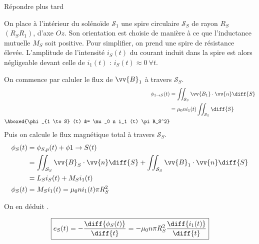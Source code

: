  Répondre plus tard

On place à l'intérieur du solénoïde $\mathcal{S}_1$ une spire circulaire $\mathcal{S}_S$ de rayon $R_S$ $\left( R_S  R_1 \right)$, d'axe $Oz$. Son orientation est choisie de manière à ce que l'inductance mutuelle $M_S$ soit positive. Pour simplifier, on prend une spire de résistance élevée. L'amplitude de l'intensité $i_S (t)$ du courant induit dans la spire est alors négligeable devant celle de $i_1 (t)$ : $i_S (t) \approx 0 ~ \forall t$.


On commence par caluler le flux de $\vv{B}_1$ à travers $\mathcal{S}_S$.
\begin{equation}
  \begin{split}
    \phi_{1 \to S} (t)
    &= \iint_{\mathcal{S}_S} \vv{B_1} \cdot \vv{n} \diff{S}\\
    &= \mu_0 n i_1 (t) \iint_{\mathcal{S}_S} \diff{S}\\
    \Aboxed{\phi_{1 \to S} (t)
    &= \mu_0 n i_1 (t) \pi R_S^2}
  \end{split}
\end{equation}
Puis on calcule le flux magnétique total à travers $\mathcal{S}_S$.
\begin{equation}
  \begin{split}
    \phi_S (t)
    &= \phi_{S,p} (t) + \phi{1 \to S} (t)\\
    &= \iint_{\mathcal{S}_S} \vv{B}_S \cdot \vv{n} \diff{S} + \iint_{\mathcal{S}_S} \vv{B}_1 \cdot \vv{n} \diff{S}\\
    &= L_S i_S (t) + M_S i_1 (t)\\
    \phi_S (t) &= M_S i_1(t) = \mu_0 n i_1 (t) \pi R_S^2
  \end{split}
\end{equation}

On en déduit .


\begin{equation}
  \boxed{e_S(t) = -\frac{\diff{\phi_S (t)}}{\diff{t}} = - \mu_0 n \pi R_S^2 \frac{\diff{i_1(t)}}{\diff{t}}}
\end{equation}

